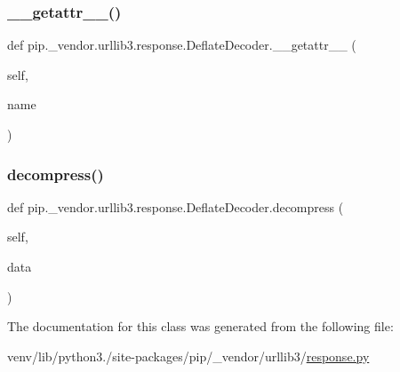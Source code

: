 \subsubsection{\texorpdfstring{\+\_\+\+\_\+getattr\+\_\+\+\_\+()}{\_\_getattr\_\_()}}
{\footnotesize\ttfamily def pip.\+\_\+vendor.\+urllib3.\+response.\+Deflate\+Decoder.\+\_\+\+\_\+getattr\+\_\+\+\_\+ (\begin{DoxyParamCaption}\item[{}]{self,  }\item[{}]{name }\end{DoxyParamCaption})}

\mbox{\label{classpip_1_1__vendor_1_1urllib3_1_1response_1_1DeflateDecoder_a603fdc7bb092d92b3d5f3f729b943e2f}} 
\subsubsection{\texorpdfstring{decompress()}{decompress()}}
{\footnotesize\ttfamily def pip.\+\_\+vendor.\+urllib3.\+response.\+Deflate\+Decoder.\+decompress (\begin{DoxyParamCaption}\item[{}]{self,  }\item[{}]{data }\end{DoxyParamCaption})}



The documentation for this class was generated from the following file\+:\begin{DoxyCompactItemize}
\item 
venv/lib/python3./site-\/packages/pip/\+\_\+vendor/urllib3/\hyperlink{response_8py}{response.\+py}\end{DoxyCompactItemize}
